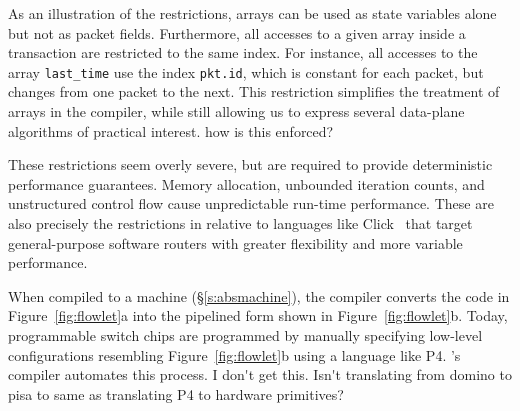 As an illustration of the restrictions, 
arrays can be used as state variables alone but not as packet fields.
Furthermore, all accesses to a given array inside a transaction are restricted
to the same index.
For instance, all accesses to
the array \texttt{last\_time} use the index \texttt{pkt.id}, which is constant
for each packet, but changes from one packet to the next. This restriction
simplifies the treatment of arrays in the compiler, while still allowing us to
express several data-plane algorithms of practical interest. \ac{how is this enforced?}

These restrictions seem overly severe, but are required to provide
deterministic performance guarantees. Memory allocation, unbounded iteration
counts, and unstructured control flow cause unpredictable run-time
performance. These are also precisely the restrictions in \pktlanguage relative
to languages like Click~\cite{click} that target general-purpose software
routers with greater flexibility and more variable performance.

When compiled to a \absmachine machine (\S\ref{s:absmachine}), the \pktlanguage
compiler converts the code in Figure~\ref{fig:flowlet}a into the pipelined form
shown in Figure~\ref{fig:flowlet}b. Today, programmable switch chips are
programmed by manually specifying low-level configurations resembling
Figure~\ref{fig:flowlet}b using a language like P4. \pktlanguage's compiler
automates this process. \ac{I don't get this. Isn't translating from domino to 
pisa to same as translating P4 to hardware primitives?}
